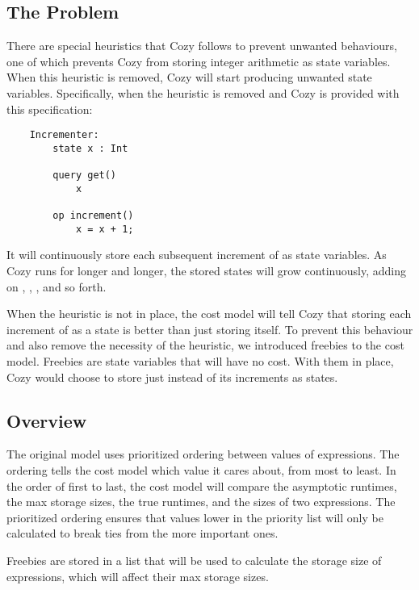 \subsection{The Problem}
There are special heuristics that Cozy follows to prevent unwanted behaviours,
one of which prevents Cozy from storing integer arithmetic as state variables.
When this heuristic is removed, Cozy will start producing unwanted state
variables. Specifically, when the heuristic is removed and Cozy is provided with
this specification:

\begin{center}
\begin{lstlisting}
    Incrementer:
        state x : Int
        
        query get()
            x
            
        op increment()
            x = x + 1;
\end{lstlisting}
\end{center}

It will continuously store each subsequent increment of  as state
variables. As Cozy runs for longer and longer, the stored states will grow
continuously, adding on , ,
, and so forth.

When the heuristic is not in place, the cost model will tell Cozy that storing
each increment of  as a state is better than just storing 
itself. To prevent this behaviour and also remove the necessity of the
heuristic, we introduced freebies to the cost model. Freebies are state
variables that will have no cost. With them in place, Cozy would choose to store
just  instead of its increments as states.

\subsection{Overview}
The original model uses prioritized ordering between values of expressions. The
ordering tells the cost model which value it cares about, from most to least. In
the order of first to last, the cost model will compare the asymptotic runtimes,
the max storage sizes, the true runtimes, and the sizes of two expressions. The
prioritized ordering ensures that values lower in the priority list will only be
calculated to break ties from the more important ones.

Freebies are stored in a list that will be used to calculate the storage size of
expressions, which will affect their max storage sizes.

